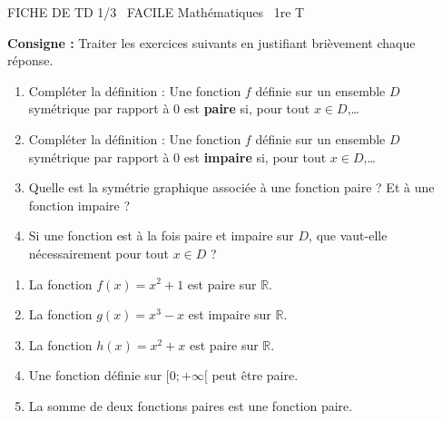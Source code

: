 \documentclass[11pt]{article}
\begin{document}
\begin{tcolorbox}[enhanced,colback=popink,colframe=popink,arc=10pt,boxrule=0pt,left=12pt,right=12pt,top=9pt,bottom=9pt]
{\color{white}\popxbold\small FICHE DE TD 1/3 \textbullet\ FACILE \hfill Mathématiques \textbullet\ 1re T\par}
\end{tcolorbox}
\vspace{4pt}
\noindent \textbf{Consigne :} Traiter les exercices suivants en justifiant brièvement chaque réponse.

\begin{exercice}
\begin{enumerate}
    \item Compléter la définition : Une fonction $f$ définie sur un ensemble $D$ symétrique par rapport à $0$ est \textbf{paire} si, pour tout $x \in D$,\ldots
    \item Compléter la définition : Une fonction $f$ définie sur un ensemble $D$ symétrique par rapport à $0$ est \textbf{impaire} si, pour tout $x \in D$,\ldots
    \item Quelle est la symétrie graphique associée à une fonction paire ? Et à une fonction impaire ?
    \item Si une fonction est à la fois paire et impaire sur $D$, que vaut-elle nécessairement pour tout $x \in D$ ?
\end{enumerate}
\end{exercice}

\begin{exercice}
\begin{enumerate}
    \item La fonction $f(x)=x^2+1$ est paire sur $\mathbb{R}$.
    \item La fonction $g(x)=x^3-x$ est impaire sur $\mathbb{R}$.
    \item La fonction $h(x)=x^2+x$ est paire sur $\mathbb{R}$.
    \item Une fonction définie sur $[0; +\infty[$ peut être paire.
    \item La somme de deux fonctions paires est une fonction paire.
\end{enumerate}
\end{exercice}
\end{document}
